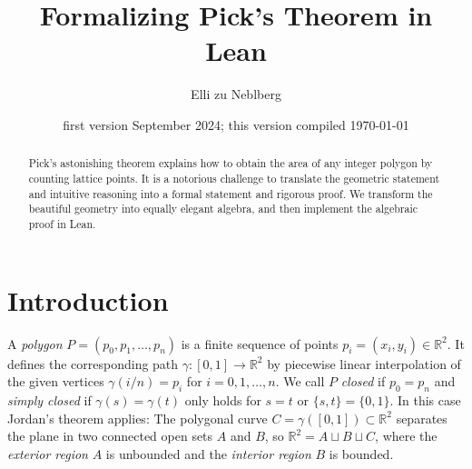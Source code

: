 \documentclass[a4paper]{amsart}
\title{Formalizing Pick's Theorem in Lean}
\author{Elli zu Neblberg}
\date{first version September 2024; this version compiled \today}
\numberwithin{equation}{section}
\theoremstyle{plain}
\theoremstyle{definition}
\newcommand{\R}{\mathbb{R}}
\begin{document}

\begin{abstract}
  Pick's astonishing theorem explains how to obtain %
  the area of any integer polygon by counting lattice points. %
  It is a notorious challenge %
  to translate the geometric statement and intuitive reasoning
  into a formal statement and rigorous proof. %
  We transform the beautiful geometry into equally elegant algebra,
  and then implement the algebraic proof in Lean.  
\end{abstract}

\maketitle


\section{Introduction} \label{sec:Introduction}




A \emph{polygon} $P = (p_0,p_1,\ldots,p_n)$ is %
a finite sequence of points $p_i = (x_i,y_i) \in \R^2$.
It defines the corresponding path $\gamma \colon [0,1] \to \R^2$
by piecewise linear interpolation of the given vertices
$\gamma(i/n) = p_i$ for $i=0,1,\dots,n$.
We call $P$ \emph{closed} if $p_0 = p_n$ and
\emph{simply closed} if $\gamma(s) = \gamma(t)$
only holds for $s = t$ or $\{s,t\} = \{0,1\}$.
In this case Jordan's theorem applies:
The polygonal curve $C = \gamma([0,1]) \subset \R^2$
separates the plane in two connected open sets $A$ and $B$,
so $\R^2 = A \sqcup B \sqcup C$, where the \emph{exterior region} $A$
is unbounded and the \emph{interior region} $B$ is bounded.
\end{document}
